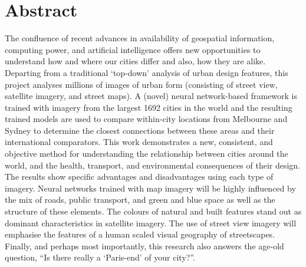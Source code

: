 \documentclass[10pt,letterpaper,hidelinks]{article}
\begin{document}
\section*{Abstract}
The confluence of recent advances in availability of geospatial information, computing power, and artificial intelligence offers new opportunities to understand how and where our cities differ and also, how they are alike. Departing from a traditional `top-down' analysis of urban design features, this project analyses millions of images of urban form (consisting of street view, satellite imagery, and street maps). A (novel) neural network-based framework is trained with imagery from the largest 1692 cities in the world and the resulting trained models are used to compare within-city locations from Melbourne and Sydney to determine the closest connections between these areas and their international comparators. This work demonstrates a new, consistent, and objective method for understanding the relationship between cities around the world, and the health, transport, and environmental consequences of their design. The results show specific advantages and disadvantages using each type of imagery. Neural networks trained with map imagery will be highly influenced by the mix of roads, public transport, and green and blue space as well as the structure of these elements. The colours of natural and built features stand out as dominant characteristics in satellite imagery. The use of street view imagery will emphasise the features of a human scaled visual geography of streetscapes. Finally, and perhaps most importantly, this research also answers the age-old question, ``Is there really a `Paris-end' of your city?''.


\end{document}
